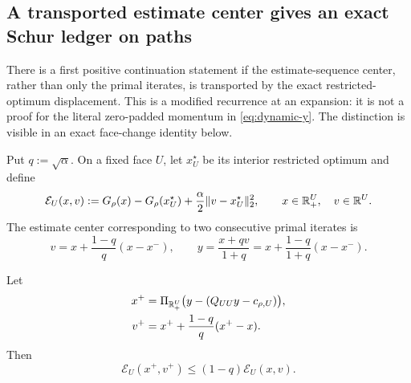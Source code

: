 \subsection{A transported estimate center gives an exact Schur ledger on paths}
\label{sec:transported-center}

There is a first positive continuation statement if the estimate-sequence
center, rather than only the primal iterates, is transported by the exact
restricted-optimum displacement.  This is a modified recurrence at an
expansion: it is not a proof for the literal zero-padded momentum in
\cref{eq:dynamic-y}.  The distinction is visible in an exact face-change
identity below.

Put $q:=\sqrt\alpha$.  On a fixed face $U$, let
$x_U^\star$ be its interior restricted optimum and define
\begin{equation}
 \mathcal E_U(x,v)
 :=G_\rho(x)-G_\rho(x_U^\star)
   +\frac{\alpha}{2}\lVert v-x_U^\star\rVert_2^2,
 \qquad x\in\mathbb{R}_+^U,\quad v\in\mathbb{R}^U.
 \label{eq:transported-energy}
\end{equation}
The estimate center corresponding to two consecutive primal iterates is
\begin{equation}
 v=x+\frac{1-q}{q}(x-x^-),
 \qquad
 y=\frac{x+qv}{1+q}
   =x+\frac{1-q}{1+q}(x-x^-).
 \label{eq:estimate-center}
\end{equation}

\begin{lemma}
\label{lem:fixed-face-estimate-center}
Let
\begin{align}
 x^+&=\Pi_{\mathbb{R}_+^U}\bigl(y-(Q_{UU}y-c_{\rho,U})\bigr),
 \label{eq:center-prox-step}\\
 v^+&=x^++\frac{1-q}{q}(x^+-x).
 \label{eq:center-update}
\end{align}
Then
\begin{equation}
 \mathcal E_U(x^+,v^+)\leq(1-q)\mathcal E_U(x,v).
 \label{eq:fixed-face-center-contraction}
\end{equation}
\end{lemma}


